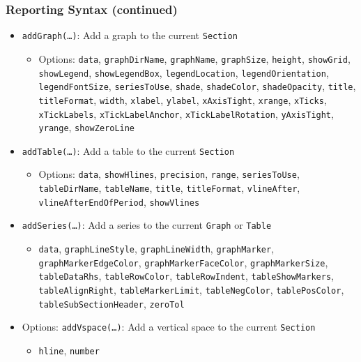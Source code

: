 \documentclass[10pt]{beamer}
\begin{document}
\begin{frame}
  \frametitle{Reporting Syntax (continued)}
  \begin{itemize}
  \item \texttt{addGraph(\ldots)}: Add a graph to the current \texttt{Section}
    \begin{itemize}
    \item Options: \texttt{data}, \texttt{graphDirName}, \texttt{graphName}, \texttt{graphSize}, \texttt{height}, \texttt{showGrid}, \texttt{showLegend}, \texttt{showLegendBox}, \texttt{legendLocation}, \texttt{legendOrientation}, \texttt{legendFontSize}, \texttt{seriesToUse}, \texttt{shade}, \texttt{shadeColor}, \texttt{shadeOpacity}, \texttt{title}, \texttt{titleFormat}, \texttt{width}, \texttt{xlabel}, \texttt{ylabel}, \texttt{xAxisTight}, \texttt{xrange}, \texttt{xTicks}, \texttt{xTickLabels}, \texttt{xTickLabelAnchor}, \texttt{xTickLabelRotation}, \texttt{yAxisTight}, \texttt{yrange}, \texttt{showZeroLine}
    \end{itemize}
  \item \texttt{addTable(\ldots)}: Add a table to the current \texttt{Section}
    \begin{itemize}
    \item Options: \texttt{data}, \texttt{showHlines}, \texttt{precision}, \texttt{range}, \texttt{seriesToUse}, \texttt{tableDirName}, \texttt{tableName}, \texttt{title}, \texttt{titleFormat}, \texttt{vlineAfter}, \texttt{vlineAfterEndOfPeriod}, \texttt{showVlines}
    \end{itemize}
  \item \texttt{addSeries(\ldots)}: Add a series to the current \texttt{Graph} or \texttt{Table}
    \begin{itemize}
    \item \texttt{data}, \texttt{graphLineStyle}, \texttt{graphLineWidth}, \texttt{graphMarker}, \texttt{graphMarkerEdgeColor}, \texttt{graphMarkerFaceColor}, \texttt{graphMarkerSize}, \texttt{tableDataRhs}, \texttt{tableRowColor}, \texttt{tableRowIndent}, \texttt{tableShowMarkers}, \texttt{tableAlignRight}, \texttt{tableMarkerLimit}, \texttt{tableNegColor}, \texttt{tablePosColor}, \texttt{tableSubSectionHeader}, \texttt{zeroTol}
    \end{itemize}
  \item Options: \texttt{addVspace(\ldots)}: Add a vertical space to the current \texttt{Section}
    \begin{itemize}
    \item \texttt{hline}, \texttt{number}
    \end{itemize}
  \end{itemize}
\end{frame}
\end{document}
